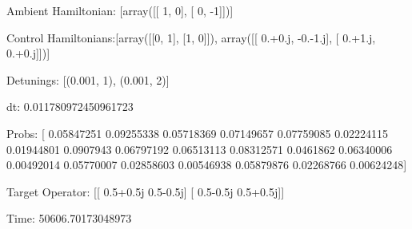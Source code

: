 \documentclass{article}
\begin{document}
    

\newpage

Ambient Hamiltonian: [array([[ 1,  0],
       [ 0, -1]])]

Control Hamiltonians:[array([[0, 1],
       [1, 0]]), array([[ 0.+0.j, -0.-1.j],
       [ 0.+1.j,  0.+0.j]])]

Detunings: [(0.001, 1), (0.001, 2)]

 dt: 0.011780972450961723

Probs: [ 0.05847251  0.09255338  0.05718369  0.07149657  0.07759085  0.02224115
  0.01944801  0.0907943   0.06797192  0.06513113  0.08312571  0.0461862
  0.06340006  0.00492014  0.05770007  0.02858603  0.00546938  0.05879876
  0.02268766  0.00624248]

Target Operator: [[ 0.5+0.5j  0.5-0.5j]
 [ 0.5-0.5j  0.5+0.5j]]

Time: 50606.70173048973
\end{document}
